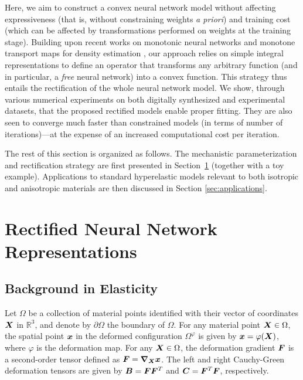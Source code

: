 Here, we aim to construct a convex neural network model without affecting expressiveness (that is, without constraining weights \textit{a priori}) and training cost (which can be affected by transformations performed on weights at the training stage). Building upon recent works on monotonic neural networks \cite{wehenkel2019unconstrained} and monotone transport maps for density estimation \cite{baptista2020adaptive}, our approach relies on simple integral representations to define an operator that transforms any arbitrary function (and in particular, a \textit{free} neural network) into a convex function. This strategy thus entails the rectification of the whole neural network model. We show, through various numerical experiments on both digitally synthesized and experimental datasets, that the proposed rectified models enable proper fitting. They are also seen to converge much faster than constrained models (in terms of number of iterations)---at the expense of an increased computational cost per iteration. 

The rest of this section is organized as follows. The mechanistic parameterization and rectification strategy are first presented in Section~\ref{sec:rectifiers} (together with a toy example). Applications to standard hyperelastic models relevant to both isotropic and anisotropic materials are then discussed in Section \ref{sec:applications}.

\section{Rectified Neural Network Representations}
\label{sec:rectifiers}

\subsection{Background in Elasticity}
Let $\Omega$ be a collection of material points identified with their vector of coordinates $\boldsymbol{X}$ in $\mathbb{R}^3$, and denote by $\partial \Omega$ the boundary of $\Omega$. For any material point $\boldsymbol{X} \in \Omega$, the spatial point $\boldsymbol{x}$ in the deformed configuration $\Omega^\varphi$ is given by $\boldsymbol{x} = \varphi (\boldsymbol{X})$, where $\varphi$ is the deformation map. For any $\boldsymbol{X} \in \Omega$, the deformation gradient $\boldsymbol{F}$ is a second-order tensor defined as $\boldsymbol{F} = \boldsymbol{\nabla}_{\boldsymbol{X}} \boldsymbol{x}$. The left and right Cauchy-Green deformation tensors are given by $\boldsymbol{B} = \boldsymbol{F} \boldsymbol{F}^T$ and $\boldsymbol{C} = \boldsymbol{F}^T \boldsymbol{F}$, respectively.

